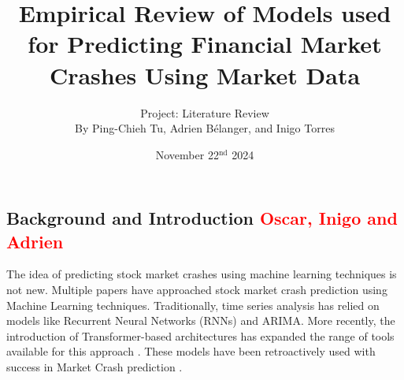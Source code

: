 \documentclass[12pt, letterpaper]{article}
\title{Empirical Review of Models used for Predicting Financial Market Crashes Using Market Data}
\author{\large Project: Literature Review \vspace{0.65em} \\ \normalsize By Ping-Chieh Tu, Adrien Bélanger, and Inigo Torres}
\date{November 22$^{\text{nd}}$ 2024}
\begin{document}
\maketitle 

\justifying %
\begin{comment}
Overall objective to keep in mind:

"In this milestone, the objective is to review the related literature to your proposal. This will better inform your methodology for your project if it involves a new idea, and it is necessary if you are comparing existing methods for a certain domain. It may even lead to a change of proposal, once you learn about existing methods out there. If you are producing a literature survey on a research topic, in this stage, you just provide a "breadth" review, in which you emphasize covering as many related works as possible and providing some preliminary organization without going into much detail."\\

Evaluation Criterias:

- Putting your proposal into context of related literature

- Coverage (are you adequately covering most relevant works)
\end{comment}

\subsection*{Background and Introduction \textcolor{red}{Oscar, Inigo and Adrien}}
The idea of predicting stock market crashes using machine learning techniques is not new.
Multiple papers have approached stock market crash prediction using Machine Learning techniques. 
Traditionally, time series analysis has relied on models like Recurrent Neural Networks (RNNs) and ARIMA. More recently, the introduction of Transformer-based architectures has expanded the range of tools available for this approach \cite{Ahmed, ArunKumar}. These models have been retroactively used with success in Market Crash prediction \cite{Okpeke}. 
\end{document}
